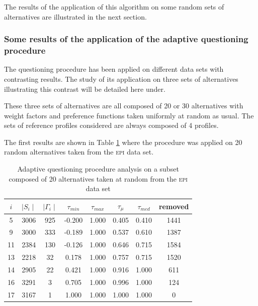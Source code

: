 The results of the application of this algorithm on some random sets of alternatives are illustrated in the next section.

\subsubsection{Some results of the application of the adaptive questioning \\ procedure}

The questioning procedure has been applied on different data sets with contrasting results.
The study of its application on three sets of alternatives illustrating this contrast will be detailed here under.

These three sets of alternatives are all composed of 20 or 30 alternatives with weight factors and preference functions taken uniformly at random as usual.
The sets of reference profiles considered are always composed of 4 profiles.

The first results are shown in Table \ref{tbl:questioning_procedure_EPI_1} where the procedure was applied on 20 random alternatives taken from the \textsc{epi} data set.

\begin{table}[h]
    \centering
    \begin{tabular}{c c           c             c                    c               c            c          c}
        \toprule
        $i$  & $\mid S_i \mid$ & $\mid \Gamma_i \mid$ & $\tau_{min} $   & $\tau_{max}$ & $\tau_{\mu}$& $\tau_{med}$  & removed  \\
         \midrule
 5 &  3006   &  925  &-0.200 & 1.000 & 0.405 & 0.410 &  1441  \\ 
 9 &  3000   &  333  &-0.189 & 1.000 & 0.537 & 0.610 &  1387  \\ 
11 &  2384   &  130  &-0.126 & 1.000 & 0.646 & 0.715 &  1584  \\ 
13 &  2218   &  32   & 0.178 & 1.000 & 0.757 & 0.715 &  1520  \\ 
14 &  2905   &  22   & 0.421 & 1.000 & 0.916 & 1.000 &   611  \\ 
16 &  3291   &   3   & 0.705 & 1.000 & 0.996 & 1.000 &   124  \\ 
17 &  3167   &   1   & 1.000 & 1.000 & 1.000 & 1.000 &    0   \\ 
        \bottomrule
    \end{tabular}
    \caption{Adaptive questioning procedure analysis on a subset composed of 20 alternatives taken at random from the \textsc{epi} data set}
    \label{tbl:questioning_procedure_EPI_1}
\end{table}

